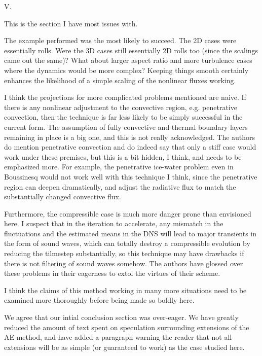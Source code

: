 \documentclass[aps, 11pt, singlecolumn]{revtex4-1} %
\begin{document}
\begin{singlespace}
\begin{myquotation}
V.

This is the section I have most issues with.

The example performed was the most likely to succeed. The 2D cases
were essentially rolls. Were the 3D cases still essentially 2D rolls
too (since the scalings came out the same)? What about larger aspect
ratio and more turbulence cases where the dynamics would be more
complex? Keeping things smooth certainly enhances the likelihood of a
simple scaling of the nonlinear fluxes working.

I think the projections for more complicated problems mentioned are
naive. If there is any nonlinear adjustment to the convective region,
e.g. penetrative convection, then the technique is far less likely to
be simply successful in the current form. The assumption of fully
convective and thermal boundary layers remaining in place is a big
one, and this is not really acknowledged. The authors do mention
penetrative convection and do indeed say that only a stiff case would
work under these premises, but this is a bit hidden, I think, and
needs to be emphasized more. For example, the penetrative ice-water
problem even in Boussinesq would not work well with this technique I
think, since the penetrative region can deepen dramatically, and
adjust the radiative flux to match the substantially changed
convective flux.

Furthermore, the compressible case is much more danger prone than
envisioned here. I suspect that in the iteration to accelerate, any
mismatch in the fluctuations and the estimated means in the DNS will
lead to major transients in the form of sound waves, which can totally
destroy a compressible evolution by reducing the tilmestep
substantially, so this technique may have drawbacks if there is not
filtering of sound waves somehow. The authors have glossed over these
problems in their eagerness to extol the virtues of their scheme.

I think the claims of this method working in many more situations need
to be examined more thoroughly before being made so boldly here.
\end{myquotation}
We agree that our intial conclusion section was over-eager. We have 
greatly reduced the amount of text spent on speculation surrounding
extensions of the AE method, and have added a paragraph warning the
reader that not all extensions will be as simple (or guaranteed to work)
as the case studied here.


\end{singlespace}
\end{document}
